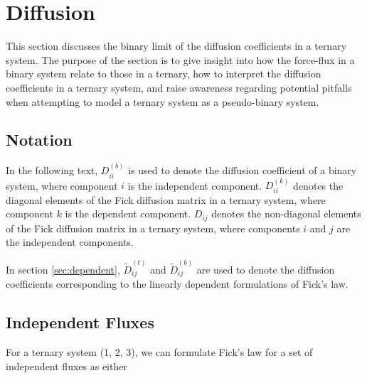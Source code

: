 \section{Diffusion}
This section discusses the binary limit of the diffusion coefficients in a ternary system. The purpose of the section is to give insight into how the force-flux in a binary system relate to those in a ternary, how to interpret the diffusion coefficients in a ternary system, and raise awareness regarding potential pitfalls when attempting to model a ternary system as a pseudo-binary system.

\subsection{Notation}

In the following text, $D_{ii}^{(b)}$ is used to denote the diffusion coefficient of a binary system, where component $i$ is the independent component. $D_{ii}^{(k)}$ denotes the diagonal elements of the Fick diffusion matrix in a ternary system, where component $k$ is the dependent component. $D_{ij}$ denotes the non-diagonal elements of the Fick diffusion matrix in a ternary system, where components $i$ and $j$ are the independent components.

In section \ref{sec:dependent}, $\tilde{D}_{ij}^{(t)}$ and $\tilde{D}_{ij}^{(b)}$ are used to denote the diffusion coefficients corresponding to the linearly dependent formulations of Fick's law.

\subsection{Independent Fluxes}\label{sec:diff_indep}

For a ternary system (1, 2, 3), we can formulate Fick's law for a set of independent fluxes as either

